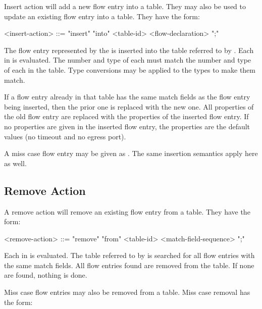 Insert action will add a new flow entry into a table. They may also be used to update an existing flow entry into a table. They have the form:

\begin{minip}
\begin{grammar}
<insert-action> ::= "insert" "into" <table-id> <flow-declaration> ";"
\end{grammar}
\end{minip}

The flow entry represented by the  is inserted into the table referred to by . Each  in  is evaluated. The number and type of each  must match the number and type of each  in the table. Type conversions may be applied to the types to make them match. 

If a flow entry already in that table has the same match fields as the flow entry being inserted, then the prior one is replaced with the new one. All properties of the old flow entry are replaced with the properties of the inserted flow entry. If no properties are given in the inserted flow entry, the properties are the default values (no timeout and no egress port).

A miss case flow entry may be given as . The same insertion semantics apply here as well.

\subsection{Remove Action} \label{guide:remove_flow}

A remove action will remove an existing flow entry from a table. They have the form:

\begin{minip}
\begin{grammar}
<remove-action> ::= "remove" "from" <table-id> <match-field-sequence> ";"
\end{grammar}
\end{minip}

Each  in  is evaluated. The table referred to by  is searched for all flow entries with the same match fields. All flow entries found are removed from the table. If none are found, nothing is done.

Miss case flow entries may also be removed from a table. Miss case removal has the form: 

